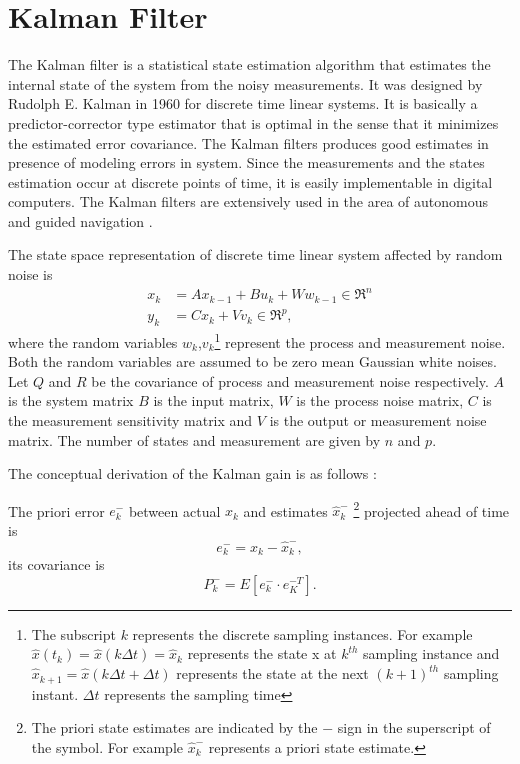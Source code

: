 \section{Kalman Filter}
The Kalman filter is a statistical state estimation algorithm that estimates the internal state of the system from the noisy measurements. It was designed by Rudolph E. Kalman in 1960 for discrete time linear systems. It is basically a predictor-corrector type estimator that is optimal in the sense that it minimizes the estimated error covariance. The Kalman filters produces good estimates in presence of modeling errors in system. Since the measurements and the states estimation occur at discrete points of time, it is easily implementable in digital computers. The Kalman filters are extensively used in the area of autonomous and guided navigation \citep{gre01}.

The state space representation of discrete time linear system affected by random noise is
\begin{equation}
    \begin{split}
        \label{eq:lin_ss}
        x_{k} &= Ax_{k-1} + Bu_k + Ww_{k-1} \in \Re^{n}\\
        y_k &= Cx_k + Vv_k \in \Re^{p},
    \end{split}
\end{equation}
where the random variables $w_k$,$v_k$\footnote{ The subscript $k$ represents the discrete sampling instances. For example $\hat{x}(t_k) = \hat{x}(k \Delta t) = \hat{x}_k$ represents the state x at $k^{th}$ sampling instance and $\hat{x}_{k+1} = \hat{x}(k \Delta t + \Delta t)$ represents the state at the next $({k+1})^{th}$ sampling instant. $\Delta t$ represents the sampling time} represent the process and measurement noise. Both the random variables are assumed to be zero mean Gaussian white noises. Let $Q$ and $R$ be the covariance of process and measurement noise respectively. $A$ is the system matrix $B$ is the input matrix, $W$ is the process noise matrix, $C$ is the measurement sensitivity matrix and $V$ is the output or measurement noise matrix. The number of states and measurement are given by $n$ and $p$.

The conceptual derivation of the Kalman gain is as follows \citep{gre01} :

The priori error $e_k^{-}$ between actual $x_k$ and estimates $\hat x_k^{-}$ \footnote{The priori state estimates are indicated by the $-$ sign in the superscript of the symbol. For example $\hat x_k^-$ represents a priori state estimate.} projected ahead of time is
 \begin{equation}
	e_k^{-} = x_k - \hat{x}_k^{-},
	\label{eq:kf_err}
\end{equation}
its covariance is
\begin{equation}
	P_k^{-} = E[e_k^{-} \cdot e_K^{-T}].
	\label{eq:kf_P}
\end{equation}

